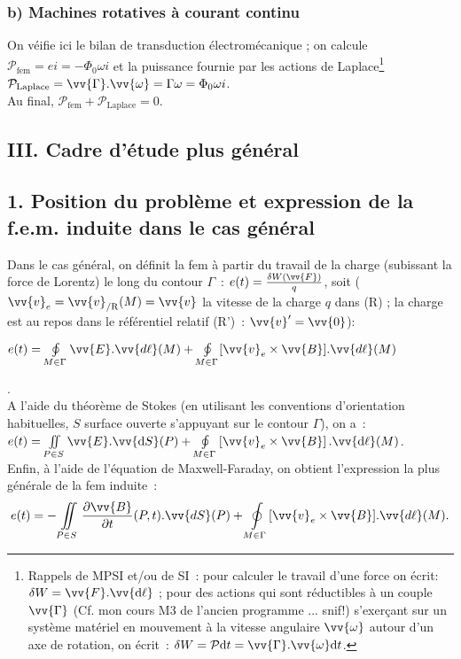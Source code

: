 \documentclass{article}
\newcommand{\mathcolorbox}[2]{\colorbox{#1}{$#2$}}
\let\oldiint\iint
\renewcommand{\iint}{\oldiint\limits}
\let\oldoint\oint
\renewcommand{\oint}{\oldoint\limits}
\renewcommand\overrightarrow{\vv}
\let\rot\relax
\DeclareMathOperator{\rot}{\overrightarrow{\mathrm{rot}}}
\begin{document}
\subsubsection*{b) Machines rotatives à courant continu}
On véifie ici le bilan de transduction électromécanique ; on calcule
$\mathcal{P}_{\mathrm{fem}} = e i = -\Phi_{0}\omega i$ et la puissance
fournie par les actions de Laplace\footnote{Rappels de MPSI et/ou de
SI : pour calculer le travail d'une force on écrit: $\delta W
=\overrightarrow{F}.\overrightarrow{\mathrm{d}\ell}$ ; pour des actions qui
sont réductibles à un couple $\overrightarrow{\Gamma}$ (Cf. mon
cours M3 de l'ancien programme ... snif!) s'exerçant sur un système
matériel en mouvement à la vitesse angulaire
$\overrightarrow{\omega}$ autour d'un axe de rotation, on écrit :
$\delta W = \mathcal{P}\mathrm{d}t =
\overrightarrow{\Gamma}.\overrightarrow{\omega}\mathrm{d}t$.}
$\mathcal{P}_{\mathrm{Laplace}} =
\overrightarrow{\Gamma}.\overrightarrow{\omega} = \Gamma \omega =
\Phi_{0}\omega i$. \\
Au final, $\mathcal{P}_{\mathrm{fem}}+\mathcal{P}_{\mathrm{Laplace}}=0$.

\subsection*{III. Cadre d'étude plus général}
\subsection*{1. Position du problème et expression de la f.e.m. induite
dans le cas général}
Dans le cas général, on définit la fem à partir du travail de la
charge (subissant la force de Lorentz) le long du contour $\Gamma$ :
$e(t) = \frac{\delta W\left(\overrightarrow{F}\right)}{q}$, soit
($\overrightarrow{v}_{e} =
\overrightarrow{v}_{\mathrm{/R}}(M)=\overrightarrow{v}$ la vitesse de la
charge $q$ dans (R) ; la charge est au repos dans le référentiel
relatif (R') : $\overrightarrow{v}'=\overrightarrow{0}$):
\\
\centerline{\mathcolorbox{gray!20}{e(t) = \oint_{M\in
\Gamma}\overrightarrow{E}.\overrightarrow{d\ell}(M)+\oint_{M\in
\Gamma}[\overrightarrow{v}_{e}\times
\overrightarrow{B}].\overrightarrow{d\ell}(M)}}. \\
A l'aide du théorème de Stokes (en utilisant les conventions
d'orientation habituelles, $S$ surface ouverte s'appuyant sur le
contour $\Gamma$), on a : $e(t) = \iint_{P\in
S}\rot \overrightarrow{E}.\overrightarrow{\mathrm{d}S}(P)+\oint_{M\in
\Gamma}\left[\overrightarrow{v}_{e}\times
\overrightarrow{B}\right].\overrightarrow{\mathrm{d}\ell}(M)$. \\
Enfin, à l'aide de l'équation de Maxwell-Faraday, on obtient
l'expression la plus générale de la fem induite :
\begin{eqnarray}\label{Eq.60}
e(t) = -\iint_{P\in S}\frac{\partial\overrightarrow{B}}{\partial
t}(P,t).\overrightarrow{dS}(P) +\oint_{M\in
\Gamma}[\overrightarrow{v}_{e}\times
\overrightarrow{B}].\overrightarrow{d\ell}(M).
\end{eqnarray}
\end{document}
